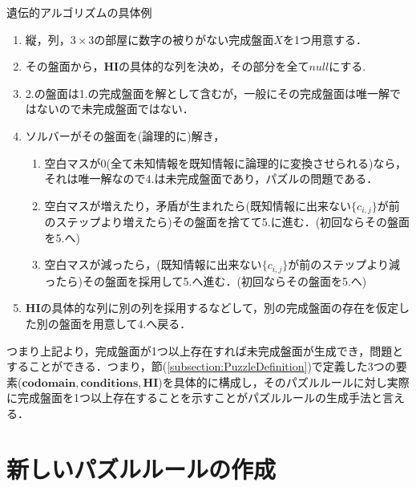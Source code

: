 \begin{example}\textup{遺伝的アルゴリズムの具体例}
  \begin{enumerate}
    \item 縦，列，$3\times3$の部屋に数字の被りがない完成盤面$X$を1つ用意する．
    \item その盤面から，$\mathbf{HI}$の具体的な列を決め，その部分を全て$null$にする.
    \item 2.の盤面は1.の完成盤面を解として含むが，一般にその完成盤面は唯一解ではないので未完成盤面ではない．
    \item ソルバーがその盤面を(論理的に)解き，
          \begin{enumerate}
            \item 空白マスが0(全て未知情報を既知情報に論理的に変換させられる)なら，それは唯一解なので4.は未完成盤面であり，パズルの問題である．
            \item 空白マスが増えたり，矛盾が生まれたら(既知情報に出来ない$\{c_{i,j}\}$が前のステップより増えたら)その盤面を捨てて5.に進む．(初回ならその盤面を5.へ)
            \item 空白マスが減ったら，(既知情報に出来ない$\{c_{i,j}\}$が前のステップより減ったら)その盤面を採用して5.へ進む．(初回ならその盤面を5.へ)
          \end{enumerate}
    \item $\mathbf{HI}$の具体的な列に別の列を採用するなどして，別の完成盤面の存在を仮定した別の盤面を用意して4.へ戻る．
  \end{enumerate}
\end{example}

つまり上記より，完成盤面が1つ以上存在すれば未完成盤面が生成でき，問題とすることができる．つまり，節(\ref{subsection:PuzzleDefinition})で定義した3つの要素($\mathbf{codomain,conditions,HI}$)を具体的に構成し，そのパズルルールに対し実際に完成盤面を1つ以上存在することを示すことがパズルルールの生成手法と言える．


\section{新しいパズルルールの作成}
